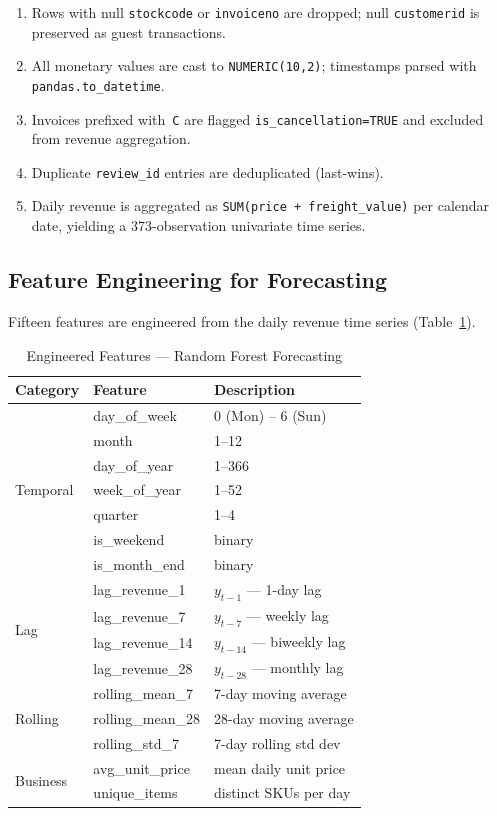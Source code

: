 \documentclass[conference]{IEEEtran}
\begin{document}
\begin{enumerate}[leftmargin=*,noitemsep,topsep=2pt]
  \item Rows with null \texttt{stockcode} or \texttt{invoiceno} are dropped; null
        \texttt{customerid} is preserved as guest transactions.
  \item All monetary values are cast to \texttt{NUMERIC(10,2)}; timestamps parsed
        with \texttt{pandas.to\_datetime}.
  \item Invoices prefixed with~\texttt{C} are flagged \texttt{is\_cancellation=TRUE}
        and excluded from revenue aggregation.
  \item Duplicate \texttt{review\_id} entries are deduplicated (last-wins).
  \item Daily revenue is aggregated as \texttt{SUM(price + freight\_value)} per
        calendar date, yielding a 373-observation univariate time series.
\end{enumerate}

\subsection{Feature Engineering for Forecasting}

Fifteen features are engineered from the daily revenue time series (Table~\ref{tab:feats}).

\begin{table}[H]
\centering
\caption{Engineered Features — Random Forest Forecasting}
\label{tab:feats}
\scriptsize
\setlength{\tabcolsep}{3pt}
\begin{tabularx}{\linewidth}{@{}l l X@{}}
\toprule
\textbf{Category} & \textbf{Feature} & \textbf{Description} \\
\midrule
\multirow{7}{*}{Temporal}
  & day\_of\_week    & 0 (Mon) – 6 (Sun) \\
  & month            & 1–12 \\
  & day\_of\_year    & 1–366 \\
  & week\_of\_year   & 1–52 \\
  & quarter          & 1–4 \\
  & is\_weekend      & binary \\
  & is\_month\_end   & binary \\
\midrule
\multirow{4}{*}{Lag}
  & lag\_revenue\_1  & $y_{t-1}$ — 1-day lag \\
  & lag\_revenue\_7  & $y_{t-7}$ — weekly lag \\
  & lag\_revenue\_14 & $y_{t-14}$ — biweekly lag \\
  & lag\_revenue\_28 & $y_{t-28}$ — monthly lag \\
\midrule
\multirow{3}{*}{Rolling}
  & rolling\_mean\_7  & 7-day moving average \\
  & rolling\_mean\_28 & 28-day moving average \\
  & rolling\_std\_7   & 7-day rolling std dev \\
\midrule
\multirow{2}{*}{Business}
  & avg\_unit\_price  & mean daily unit price \\
  & unique\_items     & distinct SKUs per day \\
\bottomrule
\end{tabularx}
\end{table}
\end{document}
